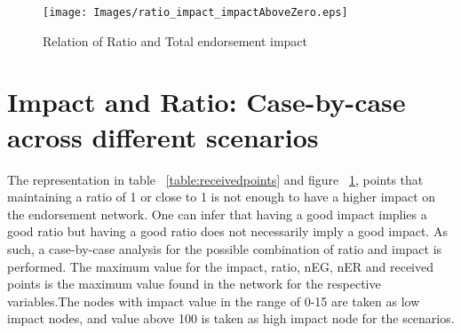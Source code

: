 \begin{figure}[h]
	\texttt{[image: Images/ratio\_impact\_impactAboveZero.eps]}
	\caption{Relation of Ratio and Total endorsement impact}
	\label{fig:ratioimpact}
\end{figure}

\section{Impact and Ratio: Case-by-case across different scenarios}
The representation in table ~\ref{table:receivedpoints} and figure
~\ref{fig:ratioimpact}, points that maintaining a ratio of 1 or close to 1 is
not enough to have a higher impact on the endorsement network. One can infer
that having a good impact implies a good ratio but having a good ratio does not
necessarily imply a good impact.
As such, a case-by-case analysis for the possible combination of ratio and
impact is performed. The maximum value for the impact, ratio, nEG, nER and
received points is the maximum value found in the network for the respective
variables.The nodes with impact value in the range of 0-15 are taken as low
impact nodes, and value above 100 is taken as high impact node for the
scenarios.   

